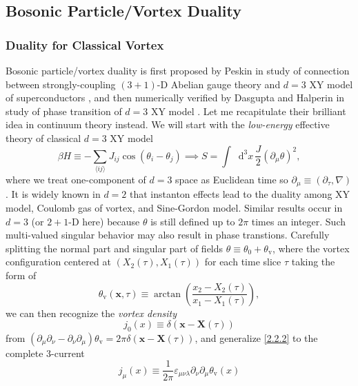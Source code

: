\documentclass[10pt,nofootinbib]{revtex4}
\newcommand*\dd{\mathop{}\!\mathrm{d}}
\numberwithin{equation}{section}
\begin{document}
	\subsection{Bosonic Particle/Vortex Duality}
		\subsubsection{Duality for Classical Vortex}
		Bosonic particle/vortex duality is first proposed by Peskin in study of connection between strongly-coupling $(3+1)$-D Abelian gauge theory and $d=3$ XY model of superconductors \cite{peskin1978mandelstam}, and then numerically verified by Dasgupta and Halperin in study of phase transition of $d=3$ XY model \cite{dasgupta1981phase}. Let me recapitulate their brilliant idea in continuum theory instead. We will start with the \emph{low-energy} effective theory of classical $d=3$ XY model
		\begin{equation}\label{2.2.1}
			\beta H\equiv-\sum_{\langle ij\rangle}J_{ij}\cos(\theta_i-\theta_j)\implies S=\int\dd^3 x\,\dfrac{J}{2}(\partial_\mu\theta)^2,
		\end{equation}
		where we treat one-component of $d=3$ space as Euclidean time so $\partial_\mu\equiv(\partial_\tau,\nabla)$. It is widely known in $d=2$ that instanton effects \cite{nagaosa2013quantum,Wen-QFT} lead to the duality among XY model, Coulomb gas of vortex, and Sine-Gordon model. Similar results occur in $d=3$ (or $2+1$-D here) because $\theta$ is still defined up to $2\pi$ times an integer. Such multi-valued singular behavior may also result in phase transtions. Carefully splitting the normal part and singular part of fields $\theta\equiv\theta_0+\theta_{\mathrm{v}}$, where the vortex configuration centered at $(X_2(\tau),X_1(\tau))$ for each time slice $\tau$ taking the form of
		\begin{equation*}
			\theta_{\mathrm{v}}(\bm{x},\tau)\equiv\arctan\left(\dfrac{x_2-X_2(\tau)}{x_1-X_1(\tau)}\right),
		\end{equation*}
		we can then recognize the \emph{vortex density}
		\begin{equation}\label{2.2.2}
			j_0(x)\equiv\delta(\bm{x}-\bm{X}(\tau))
		\end{equation}
		from $(\partial_\mu \partial_\nu- \partial_\nu \partial_\mu)\theta_{\mathrm{v}}=2\pi\delta(\bm{x}-\bm{X}(\tau))$, and generalize \eqref{2.2.2} to the complete $3$-current
		\begin{equation}\label{2.2.3}
			j_\mu(x)\equiv\dfrac{1}{2\pi}\varepsilon_{\mu\nu\lambda}\partial_\nu \partial_\mu\theta_{\mathrm{v}}(x)
		\end{equation}
\end{document}
